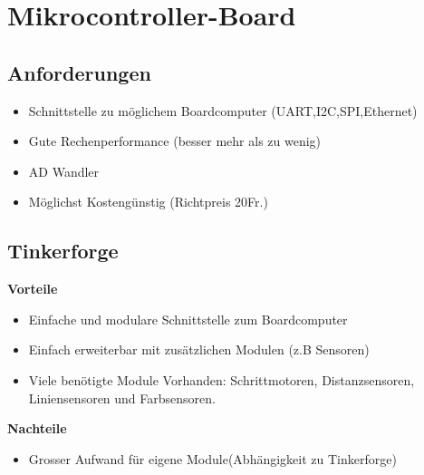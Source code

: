 \section*{Mikrocontroller-Board}
\subsection{Anforderungen}
\begin{itemize}
\item Schnittstelle zu möglichem Boardcomputer (UART,I2C,SPI,Ethernet)
\item Gute Rechenperformance (besser mehr als zu wenig)
\item AD Wandler 
\item Möglichst Kostengünstig (Richtpreis 20Fr.)
\end{itemize}


\subsection{Tinkerforge}
\textbf {Vorteile}
\begin{itemize}
\item Einfache und modulare Schnittstelle zum Boardcomputer
\item Einfach erweiterbar mit zusätzlichen Modulen (z.B Sensoren)
\item Viele benötigte Module Vorhanden: Schrittmotoren, Distanzsensoren, Liniensensoren und Farbsensoren.\\
\end{itemize}
\textbf {Nachteile}
\begin{itemize}
\item Grosser Aufwand für eigene Module(Abhängigkeit zu Tinkerforge)
\end{itemize}


